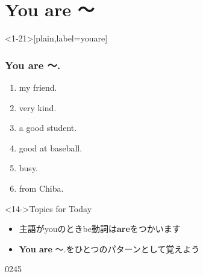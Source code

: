 \documentclass[aspectratio=169,xcolor={dvipsnames,table}]{beamer}
\begin{document}
\section{You are 〜}
\begin{frame}<1-21>[plain,label=youare]\frametitle{You are 〜.}
  \begin{enumerate}
   \item<1-> \textbf{\color{Maroon}{You are}} my friend. \hfill{}
   \item<1-> \textbf{\color{Maroon}{You are}} very kind. \hfill{}
   \item<1-> \textbf{\color{Maroon}{You are}} a good student. \hfill{}
   \item<1-> \textbf{\color{Maroon}{You are}} good at baseball. \hfill{}
   \item<1-> \textbf{\color{Maroon}{You are}} busy. \hfill{}
   \item<1-> \textbf{\color{Maroon}{You are}} from Chiba. \hfill{}
  \end{enumerate}

\bigskip

\begin{block}<14->{Topics for Today}\small
\begin{itemize}[square]
 \item 主語がyouのときbe動詞は\textbf{are}をつかいます
 \item \textbf{You are} 〜.をひとつのパターンとして覚えよう
\end{itemize}
     \end{block}

\hfill{\tiny 0245}\,{\scriptsize {}}

\end{frame}
\end{document}
